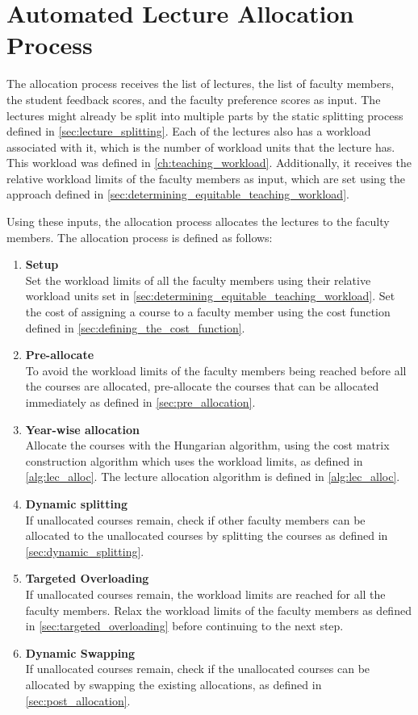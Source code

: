 \section{Automated Lecture Allocation Process}
\label{sec:allocation_process}

The allocation process receives the list of lectures, the list of faculty members, the student feedback scores, and the faculty preference scores as input. The lectures might already be split into multiple parts by the static splitting process defined in \autoref{sec:lecture_splitting}. Each of the lectures also has a workload associated with it, which is the number of workload units that the lecture has. This workload was defined in \autoref{ch:teaching_workload}. Additionally, it receives the relative workload limits of the faculty members as input, which are set using the approach defined in \autoref{sec:determining_equitable_teaching_workload}.

Using these inputs, the allocation process allocates the lectures to the faculty members. The allocation process is defined as follows:

\begin{enumerate}
  \item \textbf{Setup}\\
        Set the workload limits of all the faculty members using their relative workload units set in \autoref{sec:determining_equitable_teaching_workload}. Set the cost of assigning a course to a faculty member using the cost function defined in \autoref{sec:defining_the_cost_function}.
  \item \textbf{Pre-allocate}\\
        To avoid the workload limits of the faculty members being reached before all the courses are allocated, pre-allocate the courses that can be allocated immediately as defined in \autoref{sec:pre_allocation}.
  \item \textbf{Year-wise allocation}\\
        Allocate the courses with the Hungarian algorithm, using the cost matrix construction algorithm which uses the workload limits, as defined in \autoref{alg:lec_alloc}. The lecture allocation algorithm is defined in \autoref{alg:lec_alloc}.
  \item \textbf{Dynamic splitting}\\
        If unallocated courses remain, check if other faculty members can be allocated to the unallocated courses by splitting the courses as defined in \autoref{sec:dynamic_splitting}.
  \item \textbf{Targeted Overloading}\\
        If unallocated courses remain, the workload limits are reached for all the faculty members. Relax the workload limits of the faculty members as defined in \autoref{sec:targeted_overloading} before continuing to the next step.
  \item \textbf{Dynamic Swapping}\\
        If unallocated courses remain, check if the unallocated courses can be allocated by swapping the existing allocations, as defined in \autoref{sec:post_allocation}.
\end{enumerate}

